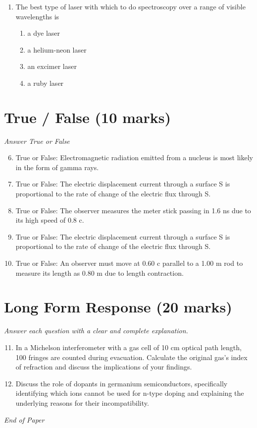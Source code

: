 \documentclass[12pt]{article}
\begin{document}
\begin{enumerate}[label=\arabic*.]
\begin{enumerate}[label=(\alph*)]
    \item 262 Hz
    \item 393 Hz
\end{enumerate}
\item The best type of laser with which to do spectroscopy over a range of visible wavelengths is
\begin{enumerate}[label=(\alph*)]
    \item a dye laser
    \item a helium-neon laser
    \item an excimer laser
    \item a ruby laser
\end{enumerate}
\end{enumerate}

\section*{True / False (10 marks)}
\textit{Answer True or False}
\begin{enumerate}[label=\arabic*.]
\setcounter{enumi}{5}
\item True or False: Electromagnetic radiation emitted from a nucleus is most likely in the form of gamma rays.
\item True or False: The electric displacement current through a surface S is proportional to the rate of change of the electric flux through S.
\item True or False: The observer measures the meter stick passing in 1.6 ns due to its high speed of 0.8 c.
\item True or False: The electric displacement current through a surface S is proportional to the rate of change of the electric flux through S.
\item True or False: An observer must move at 0.60 c parallel to a 1.00 m rod to measure its length as 0.80 m due to length contraction.
\end{enumerate}

\section*{Long Form Response (20 marks)}
\textit{Answer each question with a clear and complete explanation.}
\begin{enumerate}[label=\arabic*.]
\setcounter{enumi}{10}
\item In a Michelson interferometer with a gas cell of 10 cm optical path length, 100 fringes are counted during evacuation. Calculate the original gas's index of refraction and discuss the implications of your findings.
\item Discuss the role of dopants in germanium semiconductors, specifically identifying which ions cannot be used for n-type doping and explaining the underlying reasons for their incompatibility.
\end{enumerate}

\vfill
\noindent\textit{End of Paper}
\end{document}
